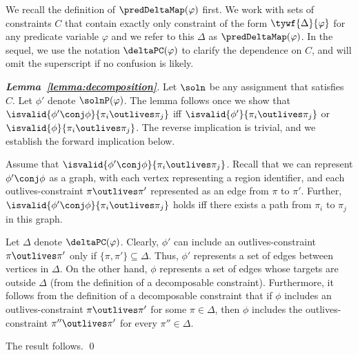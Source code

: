 We recall the definition of $\predDeltaMap(\varphi)$ first. We work with sets of constraints $C$ that
contain exactly only constraint of the form  $\tywf{\Delta}{\varphi}$ for any predicate variable $\varphi$
and we refer to this $\Delta$ as $\predDeltaMap(\varphi)$. In the sequel, we use the notation
$\deltaPC(\varphi)$ to clarify the dependence on $C$, and will omit the superscript if no confusion
is likely.


\begin{proof}[\textbf{Lemma~\ref{lemma:decomposition}}]
  Let $\soln$ be any assignment that satisfies $C$.
  Let $\phi'$ denote $\solnP(\varphi)$.
  The lemma follows once we show that
  $\isvalid{\phi' \conj \phi}{\pi_i \outlives \pi_j}$ iff
  $\isvalid{\phi'}{\pi_i \outlives \pi_j}$ or
  $\isvalid{\phi}{\pi_i \outlives \pi_j}$.
  The reverse implication is trivial, and we establish the forward implication below.

  Assume that $\isvalid{\phi' \conj \phi}{\pi_i \outlives \pi_j}$.
  Recall that we can represent $\phi' \conj \phi$ as a graph, with each vertex
  representing a region identifier, and each outlives-constraint $\pi \outlives \pi'$
  represented as an edge from $\pi$ to $\pi'$. Further,
  $\isvalid{\phi' \conj \phi}{\pi_i \outlives \pi_j}$ holds iff there exists a path
  from $\pi_i$ to $\pi_j$ in this graph.

  Let $\Delta$ denote $\deltaPC(\varphi)$.
  Clearly, $\phi'$ can include an outlives-constraint $\pi \outlives \pi'$ only if
  $\{ \pi, \pi' \} \subseteq \Delta$.
  Thus, $\phi'$ represents a set of edges between vertices in $\Delta$.
  On the other hand, $\phi$ represents a set of edges whose targets are outside $\Delta$
  (from the definition of a decomposable constraint).
  Furthermore, it follows from the definition of a decomposable constraint that
  if $\phi$ includes an outlives-constraint $\pi \outlives \pi'$ for some $\pi \in \Delta$,
  then $\phi$ includes the outlives-constraint $\pi'' \outlives \pi'$ for every $\pi'' \in \Delta$.

  The result follows.
\qed
\end{proof}

